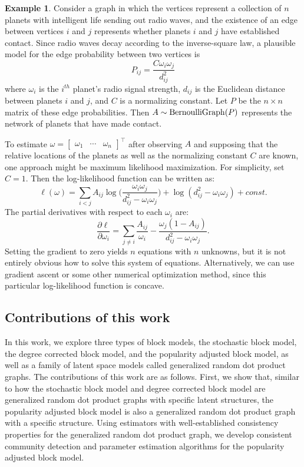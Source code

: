 \documentclass[
  11pt,
]{article}
\theoremstyle{definition}
\theoremstyle{definition}
\newtheorem{example}{Example}[section]
\theoremstyle{definition}
\theoremstyle{definition}
\theoremstyle{remark}
\begin{document}
\begin{example}
Consider a graph in which the vertices represent a collection of $n$ planets with intelligent life sending out radio waves, and the existence of an edge between vertices $i$ and $j$ represents whether planets $i$ and $j$ have established contact.  
Since radio waves decay according to the inverse-square law, a plausible model for the edge probability between two vertices is 
$$P_{ij} = \frac{C \omega_i \omega_j}{d_{ij}^2}$$ 
where $\omega_i$ is the $i^{th}$ planet's radio signal strength, $d_{ij}$ is the Euclidean distance between planets $i$ and $j$, and $C$ is a normalizing constant. 
Let $P$ be the $n \times n$ matrix of these edge probabilities. 
Then $A \sim \mathrm{BernoulliGraph}(P)$ represents the network of planets that have made contact. 

To estimate $\omega = \begin{bmatrix} \omega_1 & \cdots & \omega_n \end{bmatrix}^\top$ after observing $A$ and supposing that the relative locations of the planets as well as the normalizing constant $C$ are known, one approach might be maximum likelihood maximization. 
For simplicity, set $C = 1$. 
Then the log-likelihood function can be written as:
$$
\ell(\omega) = 
\sum_{i < j} A_{ij} \log \bigg( \frac{\omega_i \omega_j}{d_{ij}^2 -
\omega_i \omega_j} \bigg) + \log (d_{ij}^2 - \omega_i \omega_j) + const.
$$
The partial derivatives with respect to each $\omega_i$ are:
$$
\frac{\partial \ell}{\partial \omega_i} = \sum_{j \neq i} \frac{A_{ij}}{\omega_i} - \frac{\omega_j (1 - A_{ij})}{d_{ij}^2 - \omega_i \omega_j}.
$$
Setting the gradient to zero yields $n$ equations with $n$ unknowns, but it is not entirely obvious how to solve this system of equations. 
Alternatively, we can use gradient ascent or some other numerical optimization method, since this particular log-likelihood function is concave. 
\end{example}

\hypertarget{contributions-of-this-work}{%
\subsection{Contributions of this work}\label{contributions-of-this-work}}

In this work, we explore three types of block models, the stochastic block model, the degree corrected block model, and the popularity adjusted block model, as well as a family of latent space models called generalized random dot product graphs.
The contributions of this work are as follows.
First, we show that, similar to how the stochastic block model and degree corrected block model are generalized random dot product graphs with specific latent structures, the popularity adjusted block model is also a generalized random dot product graph with a specific structure.
Using estimators with well-established consistency properties for the generalized random dot product graph, we develop consistent community detection and parameter estimation algorithms for the popularity adjusted block model.
\end{document}
